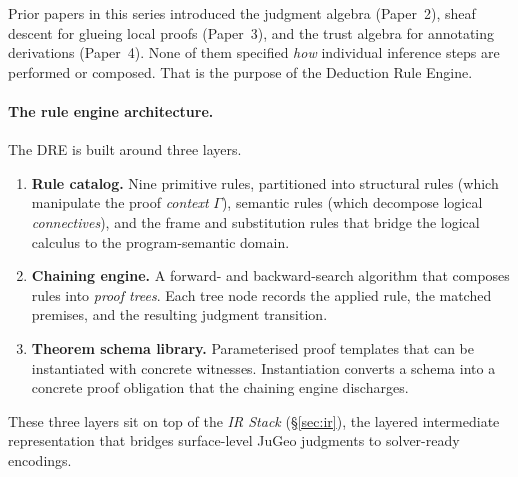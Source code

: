 \documentclass[11pt]{article}
\begin{document}
Prior papers in this series introduced the judgment algebra (Paper~2),
sheaf descent for glueing local proofs (Paper~3), and the trust algebra
for annotating derivations (Paper~4).  None of them specified \emph{how}
individual inference steps are performed or composed.  That is the
purpose of the Deduction Rule Engine.

\paragraph{The rule engine architecture.}
The \textsc{DRE} is built around three layers.

\begin{enumerate}[leftmargin=2em]
  \item \textbf{Rule catalog.}  Nine primitive rules, partitioned into
  structural rules (which manipulate the proof \emph{context} $\Gamma$),
  semantic rules (which decompose logical \emph{connectives}), and
  the frame and substitution rules that bridge the logical calculus to
  the program-semantic domain.

  \item \textbf{Chaining engine.}  A forward- and backward-search
  algorithm that composes rules into \emph{proof trees}.  Each tree
  node records the applied rule, the matched premises, and the resulting
  judgment transition.

  \item \textbf{Theorem schema library.}  Parameterised proof templates
  that can be instantiated with concrete witnesses.  Instantiation
  converts a schema into a concrete proof obligation that the chaining
  engine discharges.
\end{enumerate}

These three layers sit on top of the \emph{IR Stack} (§\ref{sec:ir}),
the layered intermediate representation that bridges surface-level
JuGeo judgments to solver-ready encodings.
\end{document}
